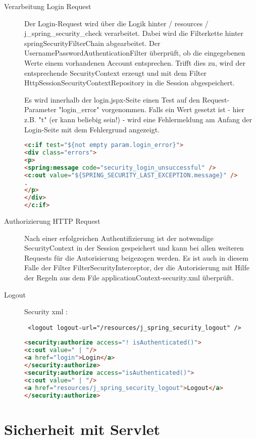 \documentclass[a4paper,10pt]{scrreprt}
\begin{document}
{\begin{description}
\item[Verarbeitung Login Request] 
Der Login-Request wird über die Logik hinter  / resources / j\_spring\_security\_check
verarbeitet. Dabei wird die Filterkette hinter springSecurityFilterChain abgearbeitet. Der
UsernamePasswordAuthenticationFilter überprüft, ob die eingegebenen Werte einem
vorhandenen Account entsprechen. Trifft dies zu, wird der entsprechende SecurityContext erzeugt
und mit dem Filter HttpSessionSecurityContextRepository in die Session abgespeichert.

Es wird innerhalb der login.jspx-Seite einen Test auf den Request-Parameter "login\_error"
vorgenommen. Falls ein Wert gesetzt ist - hier z.B. "t" (er kann beliebig sein!) - wird eine
Fehlermeldung am Anfang der Login-Seite mit dem Fehlergrund angezeigt.

\begin{lstlisting}[caption=error Behandelung spring security error output, language=html]
	<c:if test="${not empty param.login_error}">
<div class="errors">
<p>
<spring:message code="security_login_unsuccessful" />
<c:out value="${SPRING_SECURITY_LAST_EXCEPTION.message}" />
.
</p>
</div>
</c:if>
\end{lstlisting}
\item [Authorizierung HTTP Request] Nach einer erfolgreichen Authentifizierung ist der notwendige SecurityContext in der Session gespeichert und kann bei allen weiteren Requests für die Autorisierung beigezogen werden. Es ist
auch in diesem Falle der Filter FilterSecurityInterceptor, der die Autorisierung mit Hilfe der
Regeln aus dem File applicationContext-security.xml überprüft.

\item[Logout] Security xml : \begin{verbatim} <logout logout-url="/resources/j_spring_security_logout" /> \end{verbatim}
\begin{lstlisting}[caption=spring security tag lib, language=html]
<security:authorize access="! isAuthenticated()">
<c:out value=" | "/>
<a href="login">Login</a>
</security:authorize>
<security:authorize access="isAuthenticated()">
<c:out value=" | "/>
<a href="resources/j_spring_security_logout">Logout</a>
</security:authorize>
\end{lstlisting}


\end{description}

\section{Sicherheit mit Servlet}

}
\end{document}
